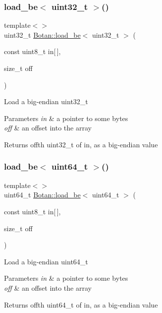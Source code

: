 \subsubsection{\texorpdfstring{load\+\_\+be$<$ uint32\+\_\+t $>$()}{load\_be< uint32\_t >()}}
{\footnotesize\ttfamily template$<$$>$ \\
uint32\+\_\+t \hyperlink{namespace_botan_a640029f085cc0a904b32e20f42303dd2}{Botan\+::load\+\_\+be}$<$ uint32\+\_\+t $>$ (\begin{DoxyParamCaption}\item[{const uint8\+\_\+t}]{in\mbox{[}$\,$\mbox{]},  }\item[{size\+\_\+t}]{off }\end{DoxyParamCaption})\hspace{0.3cm}{\ttfamily [inline]}}

Load a big-\/endian uint32\+\_\+t 
\begin{DoxyParams}{Parameters}
{\em in} & a pointer to some bytes \\
\hline
{\em off} & an offset into the array \\
\hline
\end{DoxyParams}
\begin{DoxyReturn}{Returns}
off\textquotesingle{}th uint32\+\_\+t of in, as a big-\/endian value 
\end{DoxyReturn}
\mbox{\label{namespace_botan_a96d5556307d65f0974740f8c3fc33639}} 
\subsubsection{\texorpdfstring{load\+\_\+be$<$ uint64\+\_\+t $>$()}{load\_be< uint64\_t >()}}
{\footnotesize\ttfamily template$<$$>$ \\
uint64\+\_\+t \hyperlink{namespace_botan_a640029f085cc0a904b32e20f42303dd2}{Botan\+::load\+\_\+be}$<$ uint64\+\_\+t $>$ (\begin{DoxyParamCaption}\item[{const uint8\+\_\+t}]{in\mbox{[}$\,$\mbox{]},  }\item[{size\+\_\+t}]{off }\end{DoxyParamCaption})\hspace{0.3cm}{\ttfamily [inline]}}

Load a big-\/endian uint64\+\_\+t 
\begin{DoxyParams}{Parameters}
{\em in} & a pointer to some bytes \\
\hline
{\em off} & an offset into the array \\
\hline
\end{DoxyParams}
\begin{DoxyReturn}{Returns}
off\textquotesingle{}th uint64\+\_\+t of in, as a big-\/endian value 
\end{DoxyReturn}
\mbox{\label{namespace_botan_a745efa1d08234fe3b785f17c19ec26b7}} 
